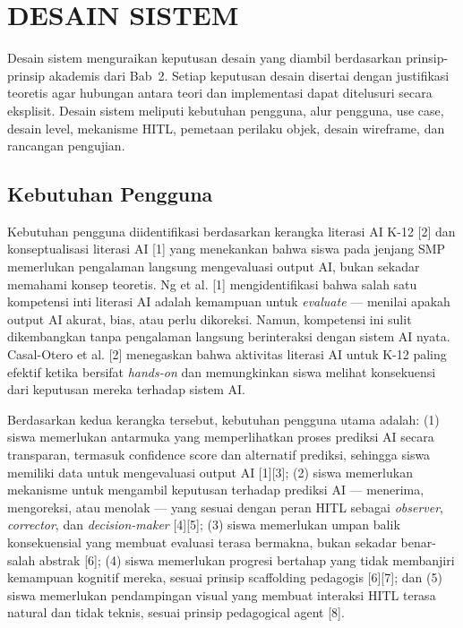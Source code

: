 \documentclass[10pt,twoside,openright]{report}
\begin{document}
\section{DESAIN SISTEM}
\label{sec:desain-sistem}

Desain sistem menguraikan keputusan desain yang diambil berdasarkan prinsip-prinsip akademis dari Bab~2. Setiap keputusan desain disertai dengan justifikasi teoretis agar hubungan antara teori dan implementasi dapat ditelusuri secara eksplisit. Desain sistem meliputi kebutuhan pengguna, alur pengguna, use case, desain level, mekanisme HITL, pemetaan perilaku objek, desain wireframe, dan rancangan pengujian.


\subsection{Kebutuhan Pengguna}
\label{subsec:kebutuhan-pengguna}

Kebutuhan pengguna diidentifikasi berdasarkan kerangka literasi AI K-12 [2] dan konseptualisasi literasi AI [1] yang menekankan bahwa siswa pada jenjang SMP memerlukan pengalaman langsung mengevaluasi output AI, bukan sekadar memahami konsep teoretis. Ng et al. [1] mengidentifikasi bahwa salah satu kompetensi inti literasi AI adalah kemampuan untuk \textit{evaluate} --- menilai apakah output AI akurat, bias, atau perlu dikoreksi. Namun, kompetensi ini sulit dikembangkan tanpa pengalaman langsung berinteraksi dengan sistem AI nyata. Casal-Otero et al. [2] menegaskan bahwa aktivitas literasi AI untuk K-12 paling efektif ketika bersifat \textit{hands-on} dan memungkinkan siswa melihat konsekuensi dari keputusan mereka terhadap sistem AI.

Berdasarkan kedua kerangka tersebut, kebutuhan pengguna utama adalah: (1) siswa memerlukan antarmuka yang memperlihatkan proses prediksi AI secara transparan, termasuk confidence score dan alternatif prediksi, sehingga siswa memiliki data untuk mengevaluasi output AI [1][3]; (2) siswa memerlukan mekanisme untuk mengambil keputusan terhadap prediksi AI --- menerima, mengoreksi, atau menolak --- yang sesuai dengan peran HITL sebagai \textit{observer}, \textit{corrector}, dan \textit{decision-maker} [4][5]; (3) siswa memerlukan umpan balik konsekuensial yang membuat evaluasi terasa bermakna, bukan sekadar benar-salah abstrak [6]; (4) siswa memerlukan progresi bertahap yang tidak membanjiri kemampuan kognitif mereka, sesuai prinsip scaffolding pedagogis [6][7]; dan (5) siswa memerlukan pendampingan visual yang membuat interaksi HITL terasa natural dan tidak teknis, sesuai prinsip pedagogical agent [8].
\end{document}
